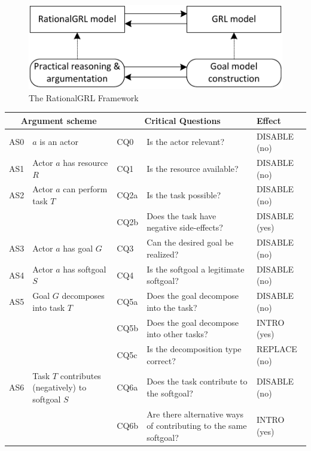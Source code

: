 \begin{figure}[t]
\centering
\includegraphics[width=\columnwidth]{img/framework.pdf}
\caption{The RationalGRL Framework}
\label{fig:rationalgrl-framework}
\end{figure}

\begin{table}[t]
\centering
\begin{tabularx}{\textwidth}{|l|l|l|X|l|}
\hline
\multicolumn{2}{|c|}{\textbf{Argument scheme}} & \multicolumn{2}{c|}{\textbf{Critical Questions}} & \textbf{Effect}\\
\hline
AS0 & $a$ is an actor & CQ0 & Is the actor relevant? & \textsf{DISABLE} (no)\\
\hline
AS1 & Actor $a$ has resource $R$ & CQ1 &Is the resource available? & \textsf{DISABLE} (no)\\
\hline
AS2 & Actor $a$ can perform task $T$ & CQ2a &Is the task possible? & \textsf{DISABLE} (no)\\
&& CQ2b & Does the task have negative side-effects? & \textsf{DISABLE} (yes)\\
\hline
AS3 & Actor $a$ has goal $G$ & CQ3 & Can the desired goal be realized? & \textsf{DISABLE} (no)\\
\hline
AS4 & Actor $a$ has softgoal $S$ & CQ4 & Is the softgoal a legitimate softgoal?& \textsf{DISABLE} (no)\\
\hline
\hline
AS5 & Goal $G$ decomposes into task $T$ & CQ5a & Does the goal decompose into the task?& \textsf{DISABLE} (no)\\
& & CQ5b & Does the goal decompose into other tasks? & \textsf{INTRO} (yes)\\
 &  & CQ5c & Is the decomposition type correct? & \textsf{REPLACE} (no)\\
\hline
AS6 & Task $T$ contributes (negatively) to softgoal $S$& CQ6a & Does the task contribute to the softgoal?& \textsf{DISABLE} (no)\\
&& CQ6b & Are there alternative ways of contributing to the same softgoal?& \textsf{INTRO} (yes) \\

\end{tabularx}
\end{table}
